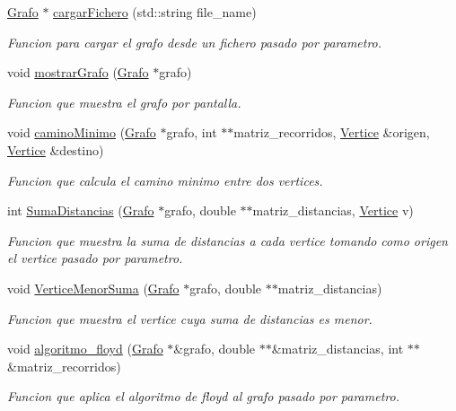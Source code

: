 \begin{DoxyCompactItemize}
\item 
\hyperlink{classed_1_1Grafo}{Grafo} $\ast$ \hyperlink{namespaceed_a564e754c90ffdcd64910fad4d2e3a2bf}{cargar\+Fichero} (std\+::string file\+\_\+name)
\begin{DoxyCompactList}\small\item\em Funcion para cargar el grafo desde un fichero pasado por parametro. \end{DoxyCompactList}\item 
void \hyperlink{namespaceed_adccb5659f086f7308fc2a87653ae5490}{mostrar\+Grafo} (\hyperlink{classed_1_1Grafo}{Grafo} $\ast$grafo)
\begin{DoxyCompactList}\small\item\em Funcion que muestra el grafo por pantalla. \end{DoxyCompactList}\item 
void \hyperlink{namespaceed_a5f0ef37f4003571c0d06cd5ed1113939}{camino\+Minimo} (\hyperlink{classed_1_1Grafo}{Grafo} $\ast$grafo, int $\ast$$\ast$matriz\+\_\+recorridos, \hyperlink{classed_1_1Vertice}{Vertice} \&origen, \hyperlink{classed_1_1Vertice}{Vertice} \&destino)
\begin{DoxyCompactList}\small\item\em Funcion que calcula el camino minimo entre dos vertices. \end{DoxyCompactList}\item 
int \hyperlink{namespaceed_a6d0e98c85a44d58e0cc6560de8dc51d1}{Suma\+Distancias} (\hyperlink{classed_1_1Grafo}{Grafo} $\ast$grafo, double $\ast$$\ast$matriz\+\_\+distancias, \hyperlink{classed_1_1Vertice}{Vertice} v)
\begin{DoxyCompactList}\small\item\em Funcion que muestra la suma de distancias a cada vertice tomando como origen el vertice pasado por parametro. \end{DoxyCompactList}\item 
void \hyperlink{namespaceed_a81f41376971c7b12ebf614903df91cd2}{Vertice\+Menor\+Suma} (\hyperlink{classed_1_1Grafo}{Grafo} $\ast$grafo, double $\ast$$\ast$matriz\+\_\+distancias)
\begin{DoxyCompactList}\small\item\em Funcion que muestra el vertice cuya suma de distancias es menor. \end{DoxyCompactList}\item 
void \hyperlink{namespaceed_af547530c0f015ed298c59837343a9b5e}{algoritmo\+\_\+floyd} (\hyperlink{classed_1_1Grafo}{Grafo} $\ast$\&grafo, double $\ast$$\ast$\&matriz\+\_\+distancias, int $\ast$$\ast$\&matriz\+\_\+recorridos)
\begin{DoxyCompactList}\small\item\em Funcion que aplica el algoritmo de floyd al grafo pasado por parametro. \end{DoxyCompactList}\end{DoxyCompactItemize}


